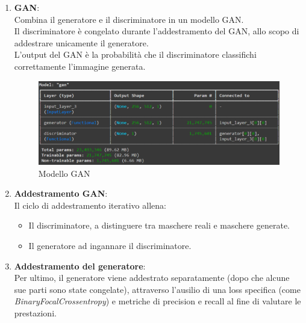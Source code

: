 \documentclass[12pt,a4paper,openright,twoside]{book}
\begin{document}
\begin{enumerate}
\item \textbf{GAN}:\\
Combina il generatore e il discriminatore in un modello GAN.\\
Il discriminatore è congelato durante l'addestramento del GAN, allo scopo di addestrare unicamente il generatore.\\
L'output del GAN è la probabilità che il discriminatore classifichi correttamente l'immagine generata.
\begin{figure}[H]
  	\centering
    	\includegraphics[width=16cm]{figures/gan.pdf}
   	\caption{Modello GAN}
	\label{fig:gan}
\end{figure}

\item \textbf{Addestramento GAN}:\\
Il ciclo di addestramento iterativo allena:
\begin{itemize}
\item Il discriminatore, a distinguere tra maschere reali e maschere generate.
\item Il generatore ad ingannare il discriminatore.
\end{itemize}

\item \textbf{Addestramento del generatore}:\\
Per ultimo, il generatore viene addestrato separatamente (dopo che alcune sue parti sono state congelate), attraverso l'ausilio di una loss specifica (come {\itshape BinaryFocalCrossentropy}) e metriche di precision e recall al fine di valutare le prestazioni.
\end{enumerate}

\end{document}
